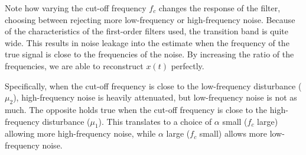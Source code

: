 \documentclass[a4paper]{article}
\begin{document}
Note how varying the cut-off frequency $f_c$ changes the response of the filter, choosing between rejecting more low-frequency or high-frequency noise.
Because of the characteristics of the first-order filters used, the transition band is quite wide.
This results in noise leakage into the estimate when the frequency of the true signal is close to the frequencies of the noise.
By increasing the ratio of the frequencies, we are able to reconstruct $x(t)$ perfectly.

Specifically, when the cut-off frequency is close to the low-frequency disturbance ($\mu_2$), high-frequency noise is heavily attenuated, but low-frequency noise is not as much.
The opposite holds true when the cut-off frequency is close to the high-frequency disturbance ($\mu_1$).
This translates to a choice of $\alpha$ small ($f_c$ large) allowing more high-frequency noise, while $\alpha$ large ($f_c$ small) allows more low-frequency noise.
\end{document}
